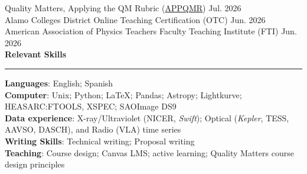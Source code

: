 \documentclass[12pt]{article}
\begin{document}
\noindent
Quality Matters, Applying the QM Rubric
(\href{https://www.credly.com/badges/3124ed08-5a8c-4fbb-8c18-6a8f96cc722b/public_url}{APPQMR})
\hfill Jul. 2026 \\
Alamo Colleges District Online Teaching Certification (OTC) \hfill Jun. 2026 \\
American Association of Physics Teachers Faculty Teaching Institute (FTI) \hfill Jun. 2026 \\


\noindent
{\bf Relevant Skills} \\
\vspace{-10mm}
\begin{center}
\rule{\textwidth}{0.2mm}
\end{center}
\vspace{-3mm}
\noindent
\textbf{Languages}: English; Spanish\\
\textbf{Computer}: Unix; Python; LaTeX; Pandas; Astropy; Lightkurve; HEASARC:FTOOLS, XSPEC; SAOImage DS9 \\
\textbf{Data experience}: X-ray/Ultraviolet (NICER, {\it Swift}); Optical ({\it Kepler}, TESS, AAVSO, DASCH), and Radio (VLA) time series \\
\textbf{Writing Skills}: Technical writing; Proposal writing \\
\textbf{Teaching}: Course design; Canvas LMS; active learning; Quality Matters course design principles \\
\end{document}
